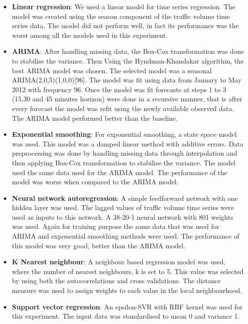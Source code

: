 \begin{itemize}

\item \textbf{Linear regression}: We used a linear model for time series regression. The model was
created using the season component of the traffic volume time series data. The model
did not perform well, in fact its performance was the worst among all the models used in this
experiment.

\item \textbf{ARIMA}: After handling missing data, the Box-Cox transformation was done to stabilise the
variance. Then Using the Hyndman-Khandakar algorithm, the best ARIMA model was chosen. The selected
model was a seasonal ARIMA(2,0,5)(1,0,0)[96]. The model was fit using data from January to May 2012 with
frequency 96. Once the model was fit forecasts at steps 1 to 3 (15,30 and 45 minutes horizon) were
done in a recursive manner, that is after every forecast the model was refit using the newly available
observed data. The ARIMA model performed better than the baseline.

\item \textbf{Exponential smoothing}: For exponential smoothing, a state space model was used. This
model was a damped linear method with additive errors. Data preprocessing was done by handling missing
data through interpolation and then applying Box-Cox transformation to stabilise the variance. The
model used the same data used for the ARIMA model. The performance of the model was worse when compared
to the ARIMA model.

\item \textbf{Neural network autoregression}: A simple feedforward network with one hidden layer
was used. The lagged values of traffic volume time series were used as inputs to this network. A
38-20-1 neural network with 801 weights was used. Again for training purpose the same data that
was used for ARIMA and exponential smoothing methods were used. The performance of this model
was very good, better than the ARIMA model.

\item \textbf{K Nearest neighbour}: A neighbour based regression model was used, where the number
of nearest neighbours, k is set to 5. This value was selected by using both the autocorrelations and
cross validations. The distance measure was used to assign weights to each value in the local
neighbourhood.

\item \textbf{Support vector regression}: An epsilon-SVR with RBF kernel was used for this experiment.
The input data was standardised to mean 0 and variance 1.

\end{itemize}

